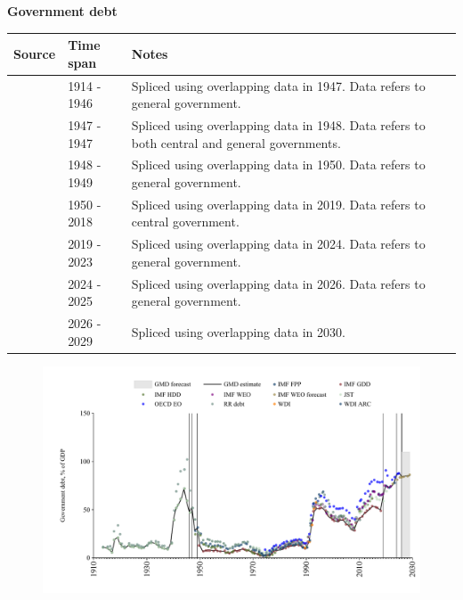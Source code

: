 \documentclass[12pt,a4paper,landscape]{article}
\begin{document}
\begin{adjustbox}{max totalsize={\paperwidth}{\paperheight},center}
\begin{minipage}[t][\textheight][t]{\textwidth}
\vspace*{0.5cm}
{}
\begin{center}
{\Large\bfseries Government debt}
\end{center}
\vspace{0.5cm}
\begin{table}[H]
\centering
\small
\begin{tabular}{|l|l|l|}
\hline
\textbf{Source} & \textbf{Time span} & \textbf{Notes} \\
\hline
\rowcolor{white}\cite{IMF_FPP}& 1914 - 1946 &Spliced using overlapping data in 1947. Data refers to general government.\\
\rowcolor{lightgray}\cite{JST}& 1947 - 1947 &Spliced using overlapping data in 1948. Data refers to both central and general governments.\\
\rowcolor{white}\cite{IMF_FPP}& 1948 - 1949 &Spliced using overlapping data in 1950. Data refers to general government.\\
\rowcolor{lightgray}\cite{IMF_GDD}& 1950 - 2018 &Spliced using overlapping data in 2019. Data refers to central government.\\
\rowcolor{white}\cite{IMF_FPP}& 2019 - 2023 &Spliced using overlapping data in 2024. Data refers to general government.\\
\rowcolor{lightgray}\cite{OECD_EO}& 2024 - 2025 &Spliced using overlapping data in 2026. Data refers to general government.\\
\rowcolor{white}\cite{IMF_WEO_forecast}& 2026 - 2029 &Spliced using overlapping data in 2030. \\
\hline
\end{tabular}
\end{table}
\begin{figure}[H]
\centering
\includegraphics[width=\textwidth,height=0.6\textheight,keepaspectratio]{graphs/FIN_govdebt_GDP.pdf}
\end{figure}
\end{minipage}
\end{adjustbox}
\end{document}
